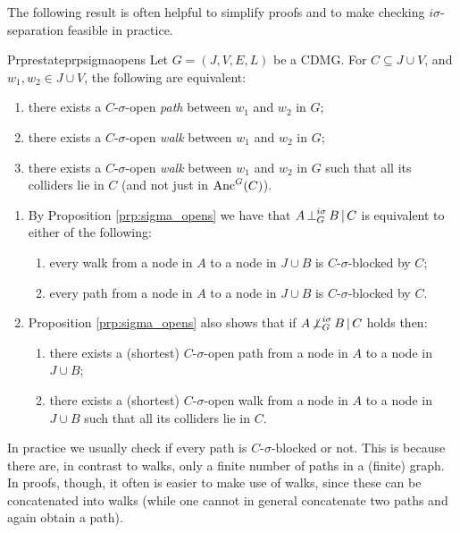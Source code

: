 The following result is often helpful to simplify proofs and to make checking $i\sigma$-separation feasible in practice.

\begin{claimmark}
\begin{restatable}{Prp}{restateprpsigmaopens}\label{prp:sigma_opens}
  Let $G=(J,V,E,L)$ be a CDMG. For $C \subseteq J \cup V$, and $w_1, w_2 \in J \cup V$, the following are
  equivalent:
  \begin{enumerate}
      \item there exists a $C$-$\sigma$-open \emph{path} between $w_1$ and $w_2$ in $G$;
      \item there exists a $C$-$\sigma$-open \emph{walk} between $w_1$ and $w_2$ in $G$;
      \item there exists a $C$-$\sigma$-open \emph{walk} between $w_1$ and $w_2$ in $G$ such that all its colliders lie in $C$ (and not just in $\mathrm{Anc}^G(C)$).
  \end{enumerate}
\end{restatable}
\end{claimmark}

\begin{claimmark}
\begin{Rem}
    \begin{enumerate}
        \item By Proposition \ref{prp:sigma_opens} we have that $A \operatorname*{\perp}^{i\sigma}_G B \operatorname*{|} C$ is equivalent to either of the following:
  \begin{enumerate}
      \item every walk from a node in $A$ to a node in $J \cup B$ is $C$-$\sigma$-blocked by $C$;
      \item every path from a node in $A$ to a node in $J \cup B$ is $C$-$\sigma$-blocked by $C$.
  \end{enumerate}
    \item Proposition \ref{prp:sigma_opens} also shows that if $A \operatorname*{\not\perp}^{i\sigma}_G B \operatorname*{|} C$ holds then:
  \begin{enumerate}
      \item there exists a (shortest) $C$-$\sigma$-open path from a node in $A$ to a node in $J \cup B$;
      \item there exists a (shortest) $C$-$\sigma$-open walk from a node in $A$ to a node in $J \cup B$ such that all its colliders lie in $C$.
  \end{enumerate}
  \end{enumerate}
  In practice we usually check if every path is $C$-$\sigma$-blocked or not. This is because there are, in contrast to walks, only a finite number of paths in a (finite) graph. In proofs, though, it often is easier to make use of walks, since these can be concatenated into walks (while one cannot in general concatenate two paths and again obtain a path).
\end{Rem}
\end{claimmark}

